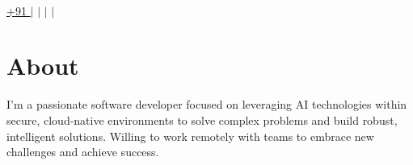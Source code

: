 \documentclass[letterpaper,12pt]{article}
\begin{document}
\begin{center}
	\textbf{\Huge \scshape \myName} \\ \vspace{5pt}
	\small
	{\expandafter\href\expandafter{tel:+91\myPhoneNumber}{\underline{+91 \myPhoneNumber}}} $|$
	{\expandafter\href\expandafter{mailto:\myEmail}{\underline{\myEmail}}} $|$
	{\expandafter\href\expandafter{https://\myWebsite}{\underline{\myWebsite}}} $|$
	{\expandafter\href\expandafter{https://\myGithub}{\underline{\myGithub}}} $|$
	{\expandafter\href\expandafter{https://www.timeanddate.com/time/zone/india/\myCityTzSlug}{\underline{\myLocation}}}
\end{center}


\section{About}
\begin{adjustwidth}{8pt}{4pt}
	\hspace{35pt}
    \small{I'm a passionate software developer focused on leveraging AI technologies within secure, cloud-native environments to solve complex problems and build robust, intelligent solutions. Willing to work remotely with teams to embrace new challenges and achieve success.}
\end{adjustwidth}
\end{document}
